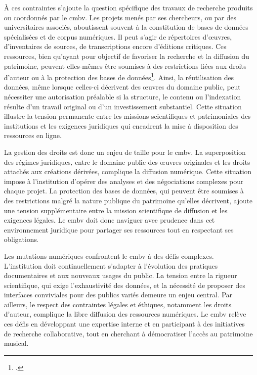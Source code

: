 À ces contraintes s’ajoute la question spécifique des travaux de recherche produits ou coordonnés par le \gls{cmbv}. Les projets menés par ses chercheurs, ou par des universitaires associés, aboutissent souvent à la constitution de bases de données spécialisées et de corpus numériques. Il peut s'agir de répertoires d’œuvres, d'inventaires de sources, de transcriptions encore d'éditions critiques. Ces ressources, bien qu’ayant pour objectif de favoriser la recherche et la diffusion du patrimoine, peuvent elles-mêmes être soumises à des restrictions liées aux droits d’auteur ou à la protection des bases de données\footcite{Directive96CE1996}. Ainsi, la réutilisation des données, même lorsque celles-ci décrivent des œuvres du domaine public, peut nécessiter une autorisation préalable si la structure, le contenu ou l’indexation résulte d’un travail original ou d’un investissement substantiel. Cette situation illustre la tension permanente entre les missions scientifiques et patrimoniales des institutions et les exigences juridiques qui encadrent la mise à disposition des ressources en ligne.

La gestion des droits est donc un enjeu de taille pour le \gls{cmbv}. La superposition des régimes juridiques, entre le domaine public des œuvres originales et les droits attachés aux créations dérivées, complique la diffusion numérique. Cette situation impose à l'institution d'opérer des analyses et des négociations complexes pour chaque projet. La protection des bases de données, qui peuvent être soumises à des restrictions malgré la nature publique du patrimoine qu'elles décrivent, ajoute une tension supplémentaire entre la mission scientifique de diffusion et les exigences légales. Le \gls{cmbv} doit donc naviguer avec prudence dans cet environnement juridique pour partager ses ressources tout en respectant ses obligations.

Les mutations numériques confrontent le \gls{cmbv} à des défis complexes. L'institution doit continuellement s'adapter à l'évolution des pratiques documentaires et aux nouveaux usages du public. La tension entre la rigueur scientifique, qui exige l'exhaustivité des données, et la nécessité de proposer des interfaces conviviales pour des publics variés demeure un enjeu central. Par ailleurs, le respect des contraintes légales et éthiques, notamment les droits d'auteur, complique la libre diffusion des ressources numériques. Le \gls{cmbv} relève ces défis en développant une expertise interne et en participant à des initiatives de recherche collaborative, tout en cherchant à démocratiser l'accès au patrimoine musical.


